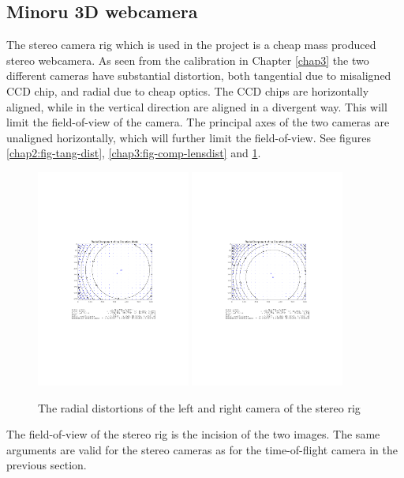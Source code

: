 \subsection{Minoru 3D webcamera}
The stereo camera rig which is used in the project is a cheap mass produced stereo
webcamera. As seen from the calibration in Chapter \ref{chap3} the two different cameras have substantial
distortion, both tangential due to misaligned CCD chip, and radial due to cheap optics.
The CCD chips are horizontally aligned, while in the vertical
direction  are aligned in a divergent way. This will limit the field-of-view of the
camera. The principal axes of the two cameras are unaligned horizontally, which will
further limit the field-of-view. See figures \ref{chap2:fig-tang-dist},
\ref{chap3:fig-comp-lensdist} and \ref{chap8:fig-rad-dist}.
\begin{figure}[htbp]
    \centering
    \includegraphics[width=0.45\textwidth]{pics/left_rad_dist}
    \includegraphics[width=0.45\textwidth]{pics/right_rad_dist}
    \caption{The radial distortions of the left and right camera of the stereo rig}
    \label{chap8:fig-rad-dist}
\end{figure}
The field-of-view of the stereo rig is the incision of the two images. The same arguments
are valid for the stereo cameras as for the time-of-flight camera in the previous section. 

